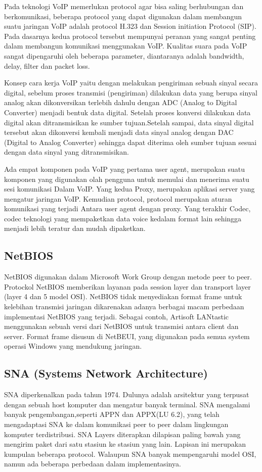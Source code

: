 Pada teknologi VoIP memerlukan protocol agar bisa saling berhubungan dan berkomunikasi, beberapa protocol yang dapat digunakan dalam 
membangun suatu jaringan VoIP adalah protocol H.323 dan Session initiation Protocol (SIP). Pada dasarnya kedua protocol tersebut 
mempunyai peranan yang sangat penting dalam membangun komunikasi menggunakan VoIP. Kualitas suara pada VoIP sangat dipengaruhi oleh 
beberapa parameter, diantaranya adalah bandwidth, delay, filter dan packet loss.

Konsep cara kerja VoIP yaitu dengan melakukan pengiriman sebuah sinyal secara digital, sebelum proses transmisi (pengiriman) dilakukan 
data yang berupa sinyal analog akan dikonversikan terlebih dahulu dengan ADC (Analog to Digital Converter) menjadi bentuk data digital. 
Setelah proses konversi dilakukan data digital akan ditransmisikan ke sumber tujuan.Setelah sampai, data sinyal digital tersebut akan 
dikonversi kembali menjadi data sinyal analog dengan DAC (Digital to Analog Converter) sehingga dapat diterima oleh sumber tujuan 
sesuai dengan data sinyal yang ditransmisikan.

Ada empat komponen pada VoIP yang pertama user agent, merupakan suatu komponen yang digunakan olah pengguna untuk memulai dan menerima 
suatu sesi komunikasi Dalam VoIP. Yang kedua Proxy, merupakan aplikasi server yang mengatur jaringan VoIP. Kemudian protocol, protocol 
merupakan aturan komunikasi yang terjadi Antara user agent dengan proxy. Yang terakhir Codec, codec teknologi yang mempaketkan data 
voice kedalam format lain sehingga menjadi lebih teratur dan mudah dipaketkan.

\subsection{NetBIOS}
NetBIOS digunakan dalam Microsoft Work Group dengan metode peer to peer. Protockol NetBIOS memberikan layanan pada session layer dan 
transport layer (layer 4 dan 5 model OSI). NetBIOS tidak menyediakan format frame untuk kelebihan transmisi jaringan dikarenakan adanya 
berbagai macam perbedaan implementasi NetBIOS yang terjadi. Sebagai contoh, Artisoft LANtastic menggunakan sebuah versi dari NetBIOS 
untuk transmisi antara client dan server. Format frame disusun di NetBEUI, yang digunakan pada semua system operasi Windows yang 
mendukung jaringan.

\subsection{SNA (Systems Network Architecture)}
SNA diperkenalkan pada tahun 1974. Dulunya adalah arsitektur yang terpusat dengan sebuah host komputer dan mengatur banyak terminal. 
SNA mengalami banyak pengembangan,seperti APPN dan APPX(LU 6.2), yang telah mengadaptasi SNA ke dalam komunikasi peer to peer dalam 
lingkungan komputer terdistribusi. SNA Layers diterapkan dilapisan paling bawah yang mengirim paket dari satu stasiun ke stasiun yang 
lain. Lapisan ini merupakan kumpulan beberapa protocol. Walaupun SNA banyak mempengaruhi model OSI, namun ada beberapa perbedaan dalam 
implementasinya.


